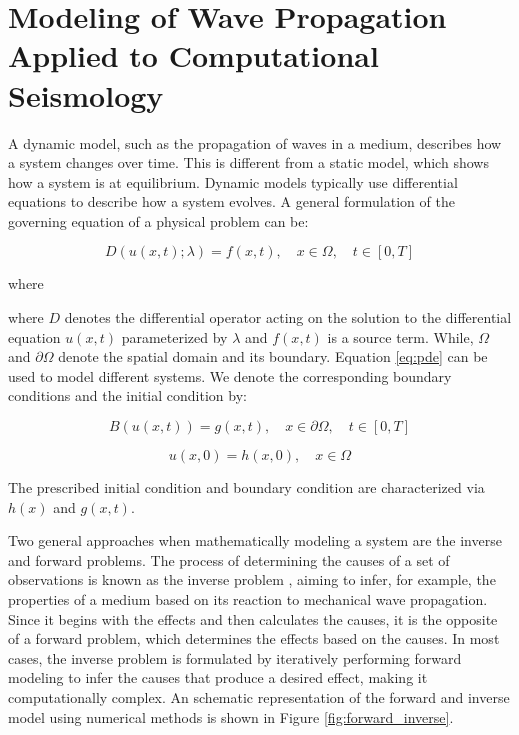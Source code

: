 \documentclass[11pt,twoside]{article}
\begin{document}
\section{Modeling of Wave Propagation Applied to Computational Seismology}\label{sec:modeling_wave_propagation}

A dynamic model, such as the propagation of waves in a medium, describes how a system changes over time. This is different from a 
static model, which shows how a system is at equilibrium. Dynamic models typically use differential equations to describe how a 
system evolves. A general formulation of the governing equation of a physical problem can be:

\begin{equation}
D(u(x,t); \lambda) = f(x,t), \quad x \in \Omega, \quad t \in [0, T]\label{eq:pde}
\end{equation}

where 

where $D$ denotes the differential operator acting on the solution to the differential equation $u(x,t)$ parameterized 
by $\lambda$ and $f(x, t)$ is a source term. While, $\Omega$ and $\partial\Omega$ denote the spatial domain and its boundary. 
Equation \ref{eq:pde} can be used to model different systems. We denote the corresponding boundary conditions and the initial 
condition by:

\begin{equation}
B (u(x, t)) = g(x, t), \quad x \in \partial \Omega, \quad t \in [0, T] 
\end{equation}

\begin{equation}
u(x, 0) = h(x, 0), \quad x \in \Omega
\end{equation}

The prescribed initial condition and boundary condition are characterized via $h(x)$ and $g(x, t)$.

Two general approaches when mathematically modeling a system are the inverse and forward problems. The process of determining the causes 
of a set of observations is known as the inverse problem \citep{Tarantola}, aiming to infer, for example, the properties of a medium 
based on its reaction to mechanical wave propagation. Since it begins with the effects and then calculates the causes, it is the 
opposite of a forward problem, which determines the effects based on the causes. In most cases, the inverse problem is formulated 
by iteratively performing forward modeling to infer the causes that produce a desired effect, making it computationally complex. 
An schematic representation of the forward and inverse model using numerical methods is shown in Figure \ref{fig:forward_inverse}.
\end{document}
